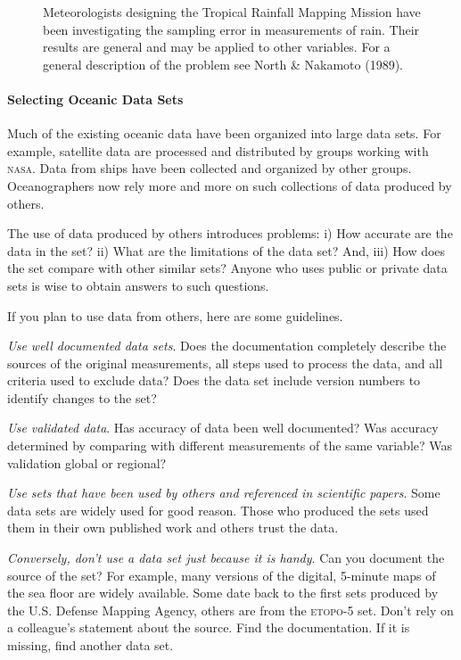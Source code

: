 \begin{figure} [t!]
{{\begin{minipage}{11.5cm}
\hspace*{1 em}Meteorologists designing the Tropical Rainfall Mapping
Mission have been investigating the sampling error in measurements of
rain. Their results are general and may be applied to other
variables. For a general description of the problem see North \&
Nakamoto (1989).
\vspace{0.7ex}
\end{minipage}
}}
\vspace{-4ex}
\end{figure}

\paragraph{Selecting Oceanic Data Sets}
Much of the existing oceanic data have been organized
into large data sets. For example, satellite data are processed and
distributed by groups working with \textsc{nasa}.  Data from ships
have been collected and organized by other groups.  Oceanographers now
rely more and more on such collections of data produced by others.

The use of data produced by others introduces problems: i) How
accurate are the data in the set? ii) What are the limitations of the
data set? And, iii) How does the set compare with other similar sets?
Anyone who uses public or private data sets is wise to obtain answers
to such questions.

If you plan to use data from others, here are some guidelines.

\begin{enumerate}
\vitem \textit{Use well documented data sets}. Does the documentation completely describe the
sources of the original measurements, all steps used to process the
data, and all criteria used to exclude data? Does the data set include
version numbers to identify changes to the set?

\vitem \textit{Use validated data}. Has
accuracy of data been well documented? Was accuracy
determined by comparing with different measurements of the same
variable? Was validation global or regional?

\vitem \textit{Use sets that have been used by others and referenced
  in scientific papers}. Some data sets are widely used for good
reason.  Those who produced the sets used them in their own published
work and others trust the data.

\vitem \textit{Conversely, don't use a data set just because it is
  handy}. Can you document the source of the set? For example, many
versions of the digital, 5-minute maps of the sea floor are widely
available. Some date back to the first sets produced by the
U.S. Defense Mapping Agency, others are from the \textsc{etopo-5}
set. Don't rely on a colleague's statement about the source. Find the
documentation. If it is missing, find another data set.
\end{enumerate}

